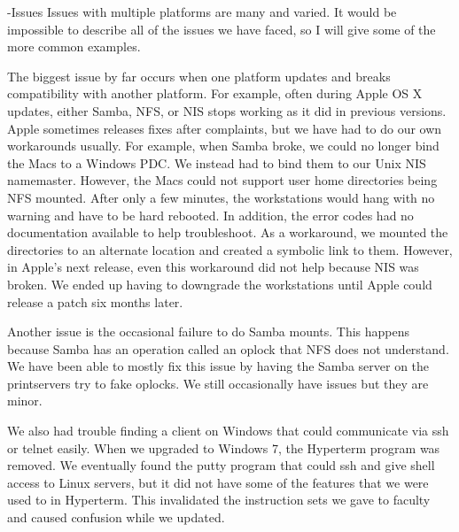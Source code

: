 -Issues
Issues with multiple platforms are many and varied.  It would be impossible to describe all of the issues we have faced, so I will give some of the more common examples.  

The biggest issue by far occurs when one platform updates and breaks compatibility with another platform.  For example, often during Apple OS X updates, either Samba, NFS, or NIS stops working as it did in previous versions.  Apple sometimes releases fixes after complaints, but we have had to do our own workarounds usually.  For example, when Samba broke, we could no longer bind the Macs to a Windows PDC.  We instead had to bind them to our Unix NIS namemaster.  However, the Macs could not support user home directories being NFS mounted.  After only a few minutes, the workstations would hang with no warning and have to be hard rebooted.  In addition, the error codes had no documentation available to help troubleshoot.  As a workaround, we mounted the directories to an alternate location and created a symbolic link to them.  However, in Apple's next release, even this workaround did not help because NIS was broken.  We ended up having to downgrade the workstations until Apple could release a patch six months later.

Another issue is the occasional failure to do Samba mounts.  This happens because Samba has an operation called an oplock that NFS does not understand.  We have been able to mostly fix this issue by having the Samba server on the printservers try to fake oplocks.  We still occasionally have issues but they are minor.  

We also had trouble finding a client on Windows that could communicate via ssh or telnet easily.  When we upgraded to Windows 7, the Hyperterm program was removed.  We eventually found the putty program that could ssh and give shell access to Linux servers, but it did not have some of the features that we were used to in Hyperterm.  This invalidated the instruction sets we gave to faculty and caused confusion while we updated.  
